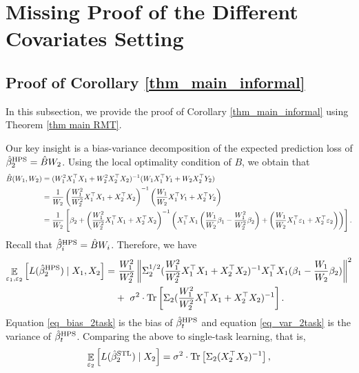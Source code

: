 \section{Missing Proof of the Different Covariates Setting} \label{sec_maintools}



\subsection{Proof of Corollary \ref{thm_main_informal}}\label{app_proof_main_thm}
In this subsection, we provide the proof of Corollary \ref{thm_main_informal} using Theorem \ref{thm main RMT}.

Our key insight is a bias-variance decomposition of the expected prediction loss of $\hat{\beta}_2^{\textup{HPS}} = \hat{B} W_2$.
Using the local optimality condition of $B$, we obtain that
\begin{align*}
	 \hat{B}(W_1, W_2) &= (W_1^2 X_1^{\top}X_1 + W_2^2 X_2^{\top}X_2)^{-1} (W_1 X_1^{\top}Y_1 + W_2 X_2^{\top}Y_2)\\
	&= \frac{1}{W_2} \left( \frac{W_1^2}{W_2^2}  X_1^{\top}X_1 + X_2^{\top}X_2\right)^{-1} \left(\frac{W_1}{W_2} X_1^{\top}Y_1 + X_2^{\top}Y_2\right) \\
	&= \frac{1}{W_2}\left[\beta_2 + \left(\frac{W_1^2}{W_2^2} X_1^{\top}X_1 + X_2^{\top}X_2\right)^{-1}\left({X_1^{\top}X_1\left(\frac{W_1}{W_2}\beta_1 - \frac{W_1^2}{W_2^2} \beta_2\right) + \left(\frac{W_1}{W_2} X_1^{\top}\varepsilon_1 + X_2^{\top}\varepsilon_2\right)}\right)\right].
\end{align*}
Recall that $\hat{\beta}_i^{\textup{HPS}} = \hat{B} W_i$. Therefore, we have
\begin{align}
	\mathop{\mathbb{E}}_{\varepsilon_1, \varepsilon_2}\left[ L(\hat{\beta}_2^{\textup{HPS}}) \mid X_1, X_2 \right]
	=&~ \frac{W_1^2}{W_2^2} \left\| \Sigma_2^{1/2}(\frac{W_1^2}{W_2^2} X_1^{\top}X_1 + X_2^{\top}X_2)^{-1} X_1^{\top}X_1 (\beta_1 - \frac{W_1}{W_2} \beta_2) \right\|^2 \label{eq_bias_2task} \\
			&+~  \sigma^2\cdot \operatorname{Tr}\left[\Sigma_2(\frac{W_1^2}{W_2^2} X_1^{\top}X_1 + X_2^{\top}X_2)^{-1} \right]. \label{eq_var_2task}
\end{align}
Equation \eqref{eq_bias_2task} is the bias of $\hat{\beta}_t^{\textup{HPS}}$ and
equation \eqref{eq_var_2task} is the variance of $\hat{\beta}_t^{\textup{HPS}}$.
Comparing the above to single-task learning, that is,
\begin{align}
	\mathop{\mathbb{E}}_{\varepsilon_2}\left[ L(\hat{\beta}_2^{\textup{STL}}) \mid X_2 \right] = \sigma^2 \cdot \operatorname{Tr}\left[\Sigma_2 (X_2^{\top} X_2)^{-1}\right], \label{eq_var_stl}
\end{align}
